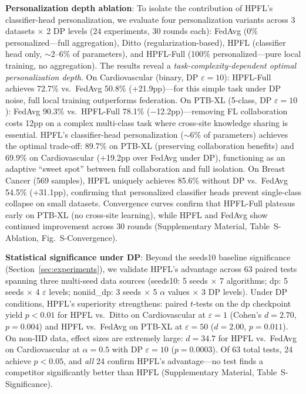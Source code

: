 \documentclass[conference,a4paper]{IEEEtran}
\begin{document}
\textbf{Personalization depth ablation}: To isolate the contribution of HPFL's classifier-head personalization, we evaluate four personalization variants across 3 datasets $\times$ 2 DP levels (24 experiments, 30 rounds each): FedAvg (0\% personalized---full aggregation), Ditto (regularization-based), HPFL (classifier head only, $\sim$2--6\% of parameters), and HPFL-Full (100\% personalized---pure local training, no aggregation). The results reveal a \textit{task-complexity-dependent optimal personalization depth}. On Cardiovascular (binary, DP $\varepsilon{=}10$): HPFL-Full achieves 72.7\% vs.\ FedAvg 50.8\% ($+$21.9pp)---for this simple task under DP noise, full local training outperforms federation. On PTB-XL (5-class, DP $\varepsilon{=}10$): FedAvg 90.3\% vs.\ HPFL-Full 78.1\% ($-$12.2pp)---removing FL collaboration costs 12pp on a complex multi-class task where cross-site knowledge sharing is essential. HPFL's classifier-head personalization ($\sim$6\% of parameters) achieves the optimal trade-off: 89.7\% on PTB-XL (preserving collaboration benefits) and 69.9\% on Cardiovascular ($+$19.2pp over FedAvg under DP), functioning as an adaptive ``sweet spot'' between full collaboration and full isolation. On Breast Cancer (569 samples), HPFL uniquely achieves 85.6\% without DP vs.\ FedAvg 54.5\% ($+$31.1pp), confirming that personalized classifier heads prevent single-class collapse on small datasets. Convergence curves confirm that HPFL-Full plateaus early on PTB-XL (no cross-site learning), while HPFL and FedAvg show continued improvement across 30 rounds (Supplementary Material, Table~S-Ablation, Fig.~S-Convergence).

\textbf{Statistical significance under DP}: Beyond the seeds10 baseline significance (Section~\ref{sec:experiments}), we validate HPFL's advantage across 63 paired tests spanning three multi-seed data sources (seeds10: 5 seeds $\times$ 7 algorithms; dp: 5 seeds $\times$ 4 $\varepsilon$ levels; noniid\_dp: 3 seeds $\times$ 5 $\alpha$ values $\times$ 3 DP levels). Under DP conditions, HPFL's superiority strengthens: paired $t$-tests on the dp checkpoint yield $p{<}0.01$ for HPFL vs.\ Ditto on Cardiovascular at $\varepsilon{=}1$ (Cohen's $d{=}2.70$, $p{=}0.004$) and HPFL vs.\ FedAvg on PTB-XL at $\varepsilon{=}50$ ($d{=}2.00$, $p{=}0.011$). On non-IID data, effect sizes are extremely large: $d{=}34.7$ for HPFL vs.\ FedAvg on Cardiovascular at $\alpha{=}0.5$ with DP $\varepsilon{=}10$ ($p{=}0.0003$). Of 63 total tests, 24 achieve $p{<}0.05$, and \textit{all} 24 confirm HPFL's advantage---no test finds a competitor significantly better than HPFL (Supplementary Material, Table~S-Significance).
\end{document}
